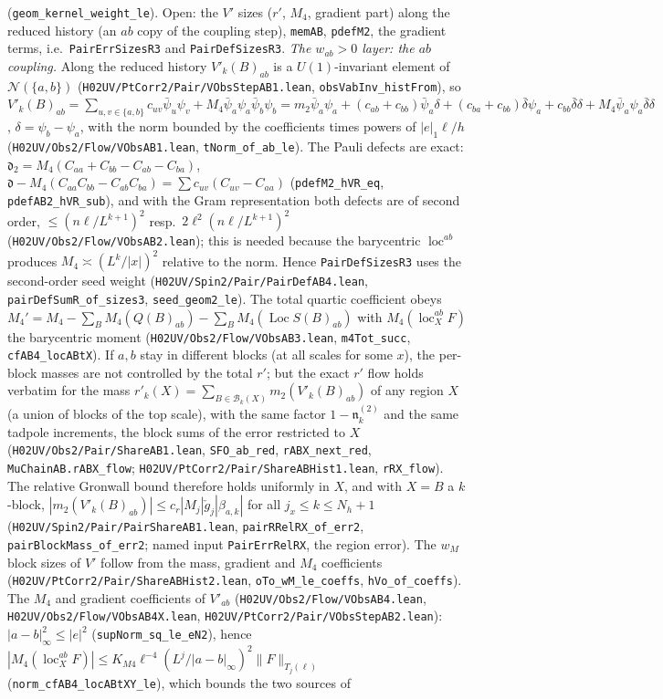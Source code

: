 \documentclass[11pt]{amsart}
\theoremstyle{definition}
\theoremstyle{remark}
\numberwithin{equation}{section}
\begin{document}
(\texttt{geom\_kernel\_weight\_le}). Open: the $V'$ sizes ($r'$, $M_4$, gradient part) along the reduced history (an $ab$ copy of the coupling step), \texttt{memAB}, \texttt{pdefM2}, the gradient terms, i.e.\ \texttt{PairErrSizesR3} and \texttt{PairDefSizesR3}. \emph{The $w_{ab}>0$ layer: the $ab$ coupling.} Along the reduced history $V'_k(B)_{ab}$ is a $U(1)$-invariant element of $\mathcal N(\{a,b\})$ (\texttt{H02UV/PtCorr2/Pair/VObsStepAB1.lean}, \texttt{obsVabInv\_histFrom}), so $V'_k(B)_{ab}=\sum_{u,v\in\{a,b\}}c_{uv}\bar\psi_u\psi_v+M_4\bar\psi_a\psi_a\bar\psi_b\psi_b=m_2\bar\psi_a\psi_a+(c_{ab}+c_{bb})\bar\psi_a\delta+(c_{ba}+c_{bb})\bar\delta\psi_a+c_{bb}\bar\delta\delta+M_4\bar\psi_a\psi_a\bar\delta\delta$, $\delta=\psi_b-\psi_a$, with the norm bounded by the coefficients times powers of $|e|_1\ell/h$ (\texttt{H02UV/Obs2/Flow/VObsAB1.lean}, \texttt{tNorm\_of\_ab\_le}). The Pauli defects are exact: $\mathfrak d_2=M_4(C_{aa}+C_{bb}-C_{ab}-C_{ba})$, $\mathfrak d-M_4(C_{aa}C_{bb}-C_{ab}C_{ba})=\sum c_{uv}(C_{uv}-C_{aa})$ (\texttt{pdefM2\_hVR\_eq}, \texttt{pdefAB2\_hVR\_sub}), and with the Gram representation both defects are of second order, $\le(n\ell/L^{k+1})^2$ resp.\ $2\ell^2(n\ell/L^{k+1})^2$ (\texttt{H02UV/Obs2/Flow/VObsAB2.lean}); this is needed because the barycentric $\operatorname{loc}^{ab}$ produces $M_4\asymp(L^k/|x|)^2$ relative to the norm. Hence \texttt{PairDefSizesR3} uses the second-order seed weight (\texttt{H02UV/Spin2/Pair/PairDefAB4.lean}, \texttt{pairDefSumR\_of\_sizes3}, \texttt{seed\_geom2\_le}). The total quartic coefficient obeys $M_4'=M_4-\sum_BM_4(Q(B)_{ab})-\sum_BM_4(\operatorname{Loc}S(B)_{ab})$ with $M_4(\operatorname{loc}^{ab}_XF)$ the barycentric moment (\texttt{H02UV/Obs2/Flow/VObsAB3.lean}, \texttt{m4Tot\_succ}, \texttt{cfAB4\_locABtX}). If $a,b$ stay in different blocks (at all scales for some $x$), the per-block masses are not controlled by the total $r'$; but the exact $r'$ flow holds verbatim for the mass $r'_k(X)=\sum_{B\in\mathcal B_k(X)}m_2(V'_k(B)_{ab})$ of any region $X$ (a union of blocks of the top scale), with the same factor $1-\mathfrak n^{(2)}_k$ and the same tadpole increments, the block sums of the error restricted to $X$ (\texttt{H02UV/Obs2/Pair/ShareAB1.lean}, \texttt{SFO\_ab\_red}, \texttt{rABX\_next\_red}, \texttt{MuChainAB.rABX\_flow}; \texttt{H02UV/PtCorr2/Pair/ShareABHist1.lean}, \texttt{rRX\_flow}). The relative Gronwall bound therefore holds uniformly in $X$, and with $X=B$ a $k$-block, $|m_2(V'_k(B)_{ab})|\le c_r|M_j|\check g_j|\beta_{a,k}|$ for all $j_x\le k\le N_h+1$ (\texttt{H02UV/Spin2/Pair/PairShareAB1.lean}, \texttt{pairRRelRX\_of\_err2}, \texttt{pairBlockMass\_of\_err2}; named input \texttt{PairErrRelRX}, the region error). The $w_M$ block sizes of $V'$ follow from the mass, gradient and $M_4$ coefficients (\texttt{H02UV/PtCorr2/Pair/ShareABHist2.lean}, \texttt{oTo\_wM\_le\_coeffs}, \texttt{hVo\_of\_coeffs}). The $M_4$ and gradient coefficients of $V'_{ab}$ (\texttt{H02UV/Obs2/Flow/VObsAB4.lean}, \texttt{H02UV/Obs2/Flow/VObsAB4X.lean}, \texttt{H02UV/PtCorr2/Pair/VObsStepAB2.lean}): $|a-b|_\infty^2\le|e|^2$ (\texttt{supNorm\_sq\_le\_eN2}), hence $|M_4(\operatorname{loc}^{ab}_XF)|\le K_{M4}\ell^{-4}(L^j/|a-b|_\infty)^2\|F\|_{T_j(\ell)}$ (\texttt{norm\_cfAB4\_locABtXY\_le}), which bounds the two sources of 
\end{document}

